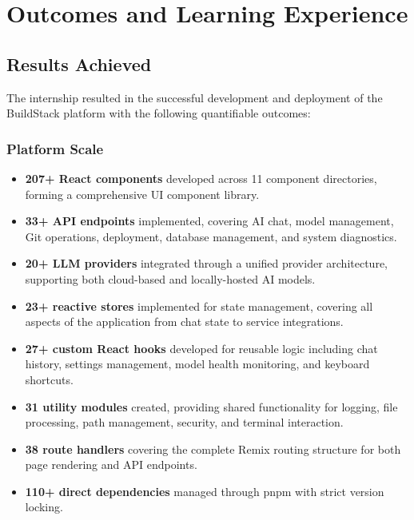 \documentclass[12pt,a4paper,openany]{report}
\begin{document}
\chapter{Outcomes and Learning Experience}

\section{Results Achieved}

The internship resulted in the successful development and deployment of the BuildStack platform with the following quantifiable outcomes:

\subsection{Platform Scale}
\begin{itemize}
    \item \textbf{207+ React components} developed across 11 component directories, forming a comprehensive UI component library.
    \item \textbf{33+ API endpoints} implemented, covering AI chat, model management, Git operations, deployment, database management, and system diagnostics.
    \item \textbf{20+ LLM providers} integrated through a unified provider architecture, supporting both cloud-based and locally-hosted AI models.
    \item \textbf{23+ reactive stores} implemented for state management, covering all aspects of the application from chat state to service integrations.
    \item \textbf{27+ custom React hooks} developed for reusable logic including chat history, settings management, model health monitoring, and keyboard shortcuts.
    \item \textbf{31 utility modules} created, providing shared functionality for logging, file processing, path management, security, and terminal interaction.
    \item \textbf{38 route handlers} covering the complete Remix routing structure for both page rendering and API endpoints.
    \item \textbf{110+ direct dependencies} managed through pnpm with strict version locking.
\end{itemize}
\end{document}
